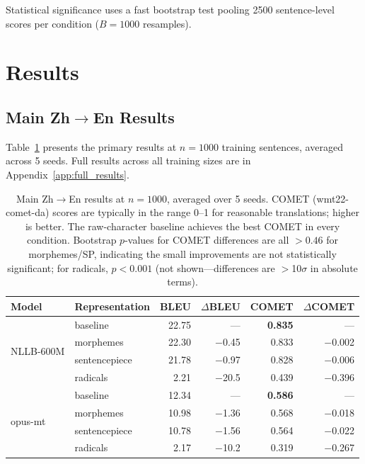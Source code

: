 \documentclass[11pt]{article}
\begin{document}
Statistical significance uses a fast bootstrap test pooling 2500 sentence-level scores per condition ($B=1000$ resamples).

\section{Results}
\label{sec:results}

\subsection{Main Zh$\to$En Results}

Table~\ref{tab:main} presents the primary results at $n=1000$ training sentences, averaged across 5 seeds. Full results across all training sizes are in Appendix~\ref{app:full_results}.

\begin{table}[t]
\centering
\small
\begin{tabular}{llrrrr}
\toprule
\textbf{Model} & \textbf{Representation} & \textbf{BLEU} & \textbf{$\Delta$BLEU} & \textbf{COMET} & \textbf{$\Delta$COMET} \\
\midrule
\multirow{4}{*}{NLLB-600M}
 & baseline       & 22.75 & ---    & \textbf{0.835} & ---    \\
 & morphemes      & 22.30 & $-$0.45 & 0.833 & $-$0.002 \\
 & sentencepiece  & 21.78 & $-$0.97 & 0.828 & $-$0.006 \\
 & radicals       &  2.21 & $-$20.5 & 0.439 & $-$0.396 \\
\midrule
\multirow{4}{*}{opus-mt}
 & baseline       & 12.34 & ---    & \textbf{0.586} & ---    \\
 & morphemes      & 10.98 & $-$1.36 & 0.568 & $-$0.018 \\
 & sentencepiece  & 10.78 & $-$1.56 & 0.564 & $-$0.022 \\
 & radicals       &  2.17 & $-$10.2 & 0.319 & $-$0.267 \\
\bottomrule
\end{tabular}
\caption{Main Zh$\to$En results at $n=1000$, averaged over 5 seeds. COMET (wmt22-comet-da) scores are typically in the range 0--1 for reasonable translations; higher is better. The raw-character baseline achieves the best COMET in every condition. Bootstrap $p$-values for COMET differences are all $>0.46$ for morphemes/SP, indicating the small improvements are not statistically significant; for radicals, $p<0.001$ (not shown---differences are $>$10$\sigma$ in absolute terms).}
\label{tab:main}
\end{table}
\end{document}
